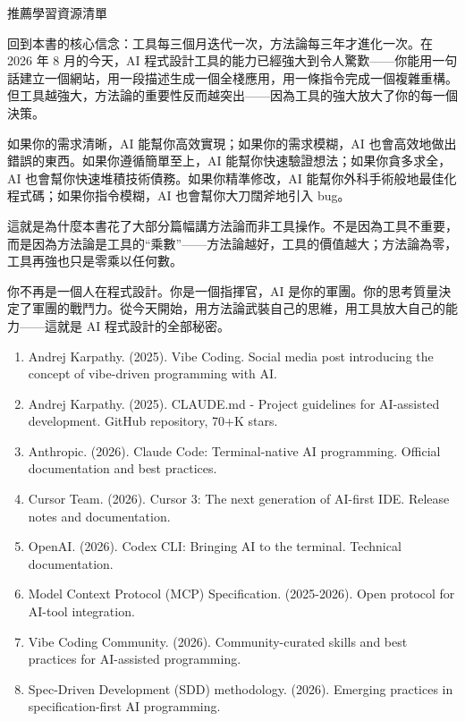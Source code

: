 \begin{center}\small\color{gray}推薦學習資源清單\end{center}


回到本書的核心信念：工具每三個月迭代一次，方法論每三年才進化一次。在 2026 年 8 月的今天，AI 程式設計工具的能力已經強大到令人驚歎——你能用一句話建立一個網站，用一段描述生成一個全棧應用，用一條指令完成一個複雜重構。但工具越強大，方法論的重要性反而越突出——因為工具的強大放大了你的每一個決策。

如果你的需求清晰，AI 能幫你高效實現；如果你的需求模糊，AI 也會高效地做出錯誤的東西。如果你遵循簡單至上，AI 能幫你快速驗證想法；如果你貪多求全，AI 也會幫你快速堆積技術債務。如果你精準修改，AI 能幫你外科手術般地最佳化程式碼；如果你指令模糊，AI 也會幫你大刀闊斧地引入 bug。

這就是為什麼本書花了大部分篇幅講方法論而非工具操作。不是因為工具不重要，而是因為方法論是工具的“乘數”——方法論越好，工具的價值越大；方法論為零，工具再強也只是零乘以任何數。

你不再是一個人在程式設計。你是一個指揮官，AI 是你的軍團。你的思考質量決定了軍團的戰鬥力。從今天開始，用方法論武裝自己的思維，用工具放大自己的能力——這就是 AI 程式設計的全部秘密。


\begin{enumerate}
  \item Andrej Karpathy. (2025). Vibe Coding. Social media post introducing the concept of vibe-driven programming with AI.
  \item Andrej Karpathy. (2025). CLAUDE.md - Project guidelines for AI-assisted development. GitHub repository, 70+K stars.
  \item Anthropic. (2026). Claude Code: Terminal-native AI programming. Official documentation and best practices.
  \item Cursor Team. (2026). Cursor 3: The next generation of AI-first IDE. Release notes and documentation.
  \item OpenAI. (2026). Codex CLI: Bringing AI to the terminal. Technical documentation.
  \item Model Context Protocol (MCP) Specification. (2025-2026). Open protocol for AI-tool integration.
  \item Vibe Coding Community. (2026). Community-curated skills and best practices for AI-assisted programming.
  \item Spec-Driven Development (SDD) methodology. (2026). Emerging practices in specification-first AI programming.
\end{enumerate}
